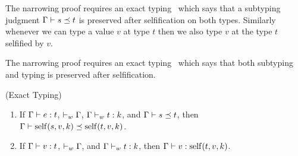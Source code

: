\begin{fullversion}
The narrowing proof
requires an exact typing~
which says that a subtyping
judgment ${\mathrm{\Gamma}} \vdash s \preceq t$
is preserved after
selfification on both types.
%
Similarly whenever we can type
a value $v$ at type $t$ then we
also type $v$ at the type $t$
selfified by $v$.
\end{fullversion}
\begin{conference}
    The narrowing proof
    requires an exact typing~
    which says that both subtyping and typing is preserved 
    after selfification.
\end{conference}
\begin{lemma} (Exact Typing) \label{lem:exact}
\begin{enumerate}
  \item If ${\mathrm{\Gamma}} \vdash {e} : {t}$, $\vdash_w {\mathrm{\Gamma}}$, ${\mathrm{\Gamma}} \vdash_w {t} : {k}$, and ${\mathrm{\Gamma}} \vdash s \preceq t$, then ${\mathrm{\Gamma}} \vdash {\rm self}(s, v, k) \preceq {\rm self}(t, v, k)$.
  \item If ${\mathrm{\Gamma}} \vdash {v} : {t}$, $\vdash_w {\mathrm{\Gamma}}$, and ${\mathrm{\Gamma}} \vdash_w {t} : {k}$, then ${\mathrm{\Gamma}} \vdash {v} : {{\rm self}(t, v, k)}$. %
\end{enumerate}
\end{lemma}








